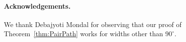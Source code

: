 \documentclass{cccg17}
\newcommand{\rednote}[1]{{}}  %
\newcommand{\thmref}[1]{\ref{thm:#1}}
\begin{document}
\paragraph{Acknowledgements.}
We thank Debajyoti Mondal for observing that our proof of Theorem~\thmref{PairPath} works for widths other than $90^\circ$.
\rednote{Rev1:
``Add more information to [BBC+16] and cite the CIAC 2017 version of [MS16]."
JOR: Done. Please check your paper.
That Rev1 knew of CIAC for [MS16] is a hint that perhaps one of M or S $=$ Rev1.}

\rednote{JOR: I reduced authors to initials to save space.}




%

\end{document}
